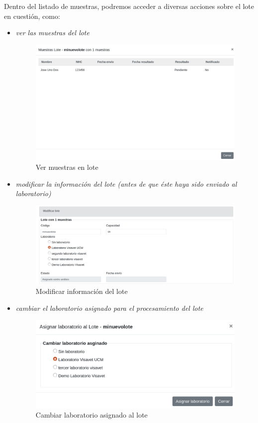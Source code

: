 \documentclass[a4paper,spanish]{paper}
\begin{document}
Dentro del listado de muestras, podremos acceder a diversas acciones sobre el lote en cuestión, como:

\begin{itemize}
    \item \emph{ver las muestras del lote}
    
\begin{figure}[h]
\centering
\includegraphics[scale=0.6]{Figs/Fig6.png}
\caption{Ver muestras en lote}
\label{Fig6}
\end{figure}

    
    \item \emph{modificar la información del lote (antes de que éste haya sido enviado al laboratorio)}
    
\begin{figure}[h]
\centering
\includegraphics[scale=0.6]{Figs/Fig7.png}
\caption{Modificar información del lote}
\label{Fig7}
\end{figure}

    
    \item \emph{cambiar el laboratorio asignado para el procesamiento del lote}
    
\begin{figure}[h]
\centering
\includegraphics[scale=0.6]{Figs/Fig8.png}
\caption{Cambiar laboratorio asignado al lote}
\label{Fig8}
\end{figure}
    

\end{itemize}
\end{document}
